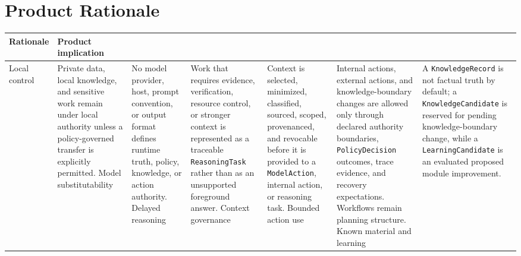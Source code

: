 \documentclass[11pt]{report}
\begin{document}
\section{Product Rationale}
\begin{center}
	\madreLogoH
\end{center}
\begin{tabularx}{.95\linewidth}{@{}lX@{}}
	\toprule
	\textbf{Rationale} & \textbf{Product implication} \\
	\midrule
	Local control & Private data, local knowledge, and sensitive work remain under local authority unless a policy-governed transfer is explicitly permitted. \n
	Model substitutability & No model provider, host, prompt convention, or output format defines runtime truth, policy, knowledge, or action authority. \n
	Delayed reasoning & Work that requires evidence, verification, resource control, or stronger context is represented as a traceable \texttt{ReasoningTask} rather than as an unsupported foreground answer. \n
	Context governance & Context is selected, minimized, classified, sourced, scoped, provenanced, and revocable before it is provided to a \texttt{ModelAction}, internal action, or reasoning task. \n
	Bounded action use & Internal actions, external actions, and knowledge-boundary changes are allowed only through declared authority boundaries, \texttt{PolicyDecision} outcomes, trace evidence, and recovery expectations. Workflows remain planning structure. \n
	Known material and learning & A \texttt{KnowledgeRecord} is not factual truth by default; a \texttt{KnowledgeCandidate} is reserved for pending knowledge-boundary change, while a \texttt{LearningCandidate} is an evaluated proposed module improvement. \\
	\bottomrule
\end{tabularx}
\end{document}
